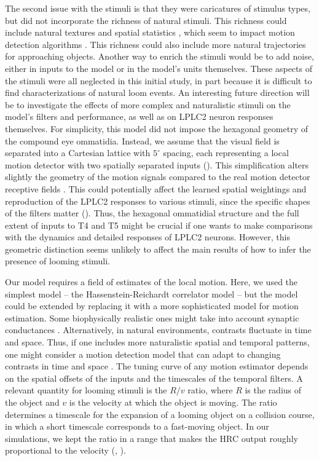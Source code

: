 \documentclass[pdftex,9pt,lineno]{elife}
\begin{document}
The second issue with the stimuli is that they were caricatures of stimulus types, but did not incorporate the richness of natural stimuli. This richness could include natural textures and spatial statistics \citep{ruderman1994statistics}, which seem to impact motion detection algorithms \citep{fitzgerald2015nonlinear,leonhardt2016asymmetry,chen2019asymmetric}. This richness could also include more natural trajectories for approaching objects. Another way to enrich the stimuli would be to add noise, either in inputs to the model or in the model's units themselves. These aspects of the stimuli were all neglected in this initial study, in part because it is difficult to find characterizations of natural loom events. An interesting future direction will be to investigate the effects of more complex and naturalistic stimuli on the model's filters and performance, as well as on LPLC2 neuron responses themselves. 
For simplicity, this model did not impose the hexagonal geometry of the compound eye ommatidia. Instead, we assume that the visual field is separated into a Cartesian lattice with $5^{\circ}$ spacing, each representing a local motion detector with two spatially separated inputs (). This simplification alters slightly the geometry of the motion signals compared to the real motion detector receptive fields \citep{shinomiya2019comparisons}. This could potentially affect the learned spatial weightings and reproduction of the LPLC2 responses to various stimuli, since the specific shapes of the filters matter (). Thus, the hexagonal ommatidial structure and the full extent of inputs to T4 and T5 might be crucial if one wants to make comparisons with the dynamics and detailed responses of LPLC2 neurons. However, this geometric distinction seems unlikely to affect the main results of how to infer the presence of looming stimuli.

Our model requires a field of estimates of the local motion. Here, we used the simplest model -- the Hassenstein-Reichardt correlator model  \citep{hassenstein1956systemtheoretische} -- but the model could be extended by replacing it with a more sophisticated model for motion estimation. Some biophysically realistic ones might take into account synaptic conductances \citep{gruntman2018simple,gruntman2019computation,badwan2019dynamic,zavatone2020minimal}. Alternatively, in natural environments, contrasts fluctuate in time and space. Thus, if one includes more naturalistic spatial and temporal patterns, one might consider a motion detection model that can adapt to changing contrasts in time and space  \citep{drews2020dynamic,matulis2020heterogeneous}. The tuning curve of any motion estimator depends on the spatial offsets of the inputs and the timescales of the temporal filters. A relevant quantity for looming stimuli is the $R/v$ ratio, where $R$ is the radius of the object and  $v$ is the velocity at which the object is moving. The ratio determines a timescale for the expansion of a looming object on a collision course, in which a short timescale corresponds to a fast-moving object. In our simulations, we kept the ratio in a range that makes the HRC output roughly proportional to the velocity (, ).
\end{document}
